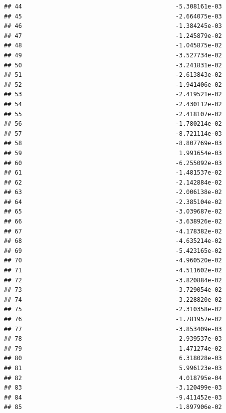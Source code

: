 \documentclass[
]{article}
\begin{document}
\begin{verbatim}
## 44                                           -5.308161e-03
## 45                                           -2.664075e-03
## 46                                           -1.384245e-03
## 47                                           -1.245879e-02
## 48                                           -1.045875e-02
## 49                                           -3.527734e-02
## 50                                           -3.241831e-02
## 51                                           -2.613843e-02
## 52                                           -1.941406e-02
## 53                                           -2.419521e-02
## 54                                           -2.430112e-02
## 55                                           -2.418107e-02
## 56                                           -1.780214e-02
## 57                                           -8.721114e-03
## 58                                           -8.807769e-03
## 59                                            1.991654e-03
## 60                                           -6.255092e-03
## 61                                           -1.481537e-02
## 62                                           -2.142884e-02
## 63                                           -2.006138e-02
## 64                                           -2.385104e-02
## 65                                           -3.039687e-02
## 66                                           -3.638926e-02
## 67                                           -4.178382e-02
## 68                                           -4.635214e-02
## 69                                           -5.423165e-02
## 70                                           -4.960520e-02
## 71                                           -4.511602e-02
## 72                                           -3.820884e-02
## 73                                           -3.729054e-02
## 74                                           -3.228820e-02
## 75                                           -2.310358e-02
## 76                                           -1.781957e-02
## 77                                           -3.853409e-03
## 78                                            2.939537e-03
## 79                                            1.471274e-02
## 80                                            6.318028e-03
## 81                                            5.996123e-03
## 82                                            4.018795e-04
## 83                                           -3.120499e-03
## 84                                           -9.411452e-03
## 85                                           -1.897906e-02

\end{verbatim}
\end{document}
